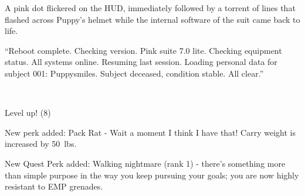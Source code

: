 
A pink dot flickered on the HUD, immediately followed by a torrent of lines that flashed across Puppy's helmet while the internal software of the suit came back to life.

{\mt ``Reboot complete. Checking version. Pink suite 7.0 lite. Checking equipment status. All systems online. Resuming last session. Loading personal data for subject 001: Puppysmiles. Subject deceased, condition stable. All clear.''}


~\vfill

\begin{engnote}
		Level up! (8)
	
		New perk added: Pack Rat - Wait a moment I think I have that! Carry weight is increased by \SI{50}{lbs}.
	
		New Quest Perk added: Walking nightmare (rank 1) - there's something more than simple purpose in the way you keep pursuing your goals; you are now highly resistant to EMP grenades.
\end{engnote}

